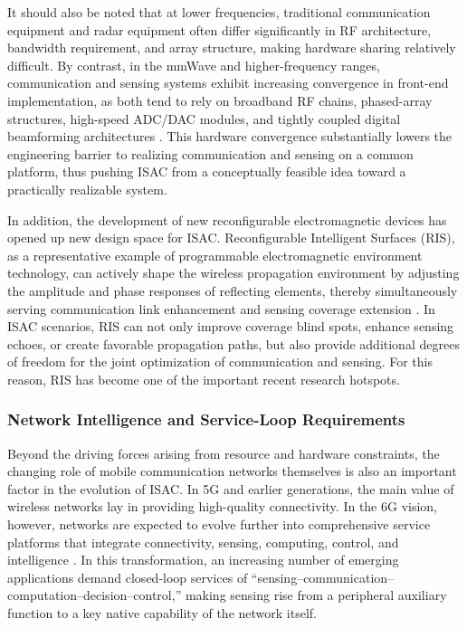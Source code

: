 It should also be noted that at lower frequencies, traditional communication equipment and radar equipment often differ significantly in RF architecture, bandwidth requirement, and array structure, making hardware sharing relatively difficult. By contrast, in the mmWave and higher-frequency ranges, communication and sensing systems exhibit increasing convergence in front-end implementation, as both tend to rely on broadband RF chains, phased-array structures, high-speed ADC/DAC modules, and tightly coupled digital beamforming architectures \cite{Liu2022ISAC,Rappaport2019WirelessTHz}. This hardware convergence substantially lowers the engineering barrier to realizing communication and sensing on a common platform, thus pushing ISAC from a conceptually feasible idea toward a practically realizable system.

In addition, the development of new reconfigurable electromagnetic devices has opened up new design space for ISAC. Reconfigurable Intelligent Surfaces (RIS), as a representative example of programmable electromagnetic environment technology, can actively shape the wireless propagation environment by adjusting the amplitude and phase responses of reflecting elements, thereby simultaneously serving communication link enhancement and sensing coverage extension \cite{Chepuri2023integrated}. In ISAC scenarios, RIS can not only improve coverage blind spots, enhance sensing echoes, or create favorable propagation paths, but also provide additional degrees of freedom for the joint optimization of communication and sensing. For this reason, RIS has become one of the important recent research hotspots.

\subsubsection{Network Intelligence and Service-Loop Requirements}
\label{subsubsec:ch1-driving-force-network}

Beyond the driving forces arising from resource and hardware constraints, the changing role of mobile communication networks themselves is also an important factor in the evolution of ISAC. In 5G and earlier generations, the main value of wireless networks lay in providing high-quality connectivity. In the 6G vision, however, networks are expected to evolve further into comprehensive service platforms that integrate connectivity, sensing, computing, control, and intelligence \cite{Gonzalez2024integrated,Saad2020Vision6G}. In this transformation, an increasing number of emerging applications demand closed-loop services of ``sensing--communication--computation--decision--control,'' making sensing rise from a peripheral auxiliary function to a key native capability of the network itself.

